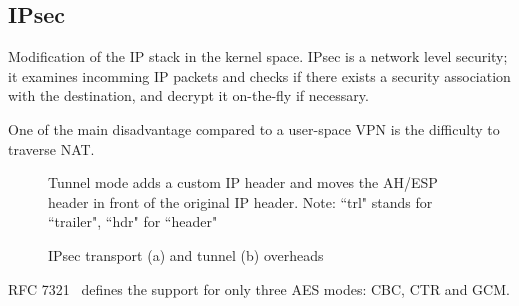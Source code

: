 \subsection{IPsec}
Modification of the IP stack in the kernel space.
IPsec is a network level security; it examines incomming IP packets and checks if there exists a security association with the destination, and decrypt it on-the-fly if necessary.

One of the main disadvantage compared to a user-space VPN is the difficulty to traverse NAT.


\begin{figure}[ht]
\center
{}
\caption{IPsec transport (a) and tunnel (b) overheads}{Tunnel mode adds a custom IP header and moves the AH/ESP header in front of the original IP header. Note: ``trl" stands for ``trailer", ``hdr" for ``header"}
\label{fig:ipsec-transport-tunnel}
\end{figure}

RFC 7321~\cite{rfc7321} defines the support for only three AES modes: CBC, CTR and GCM.





\newsavebox\myv


